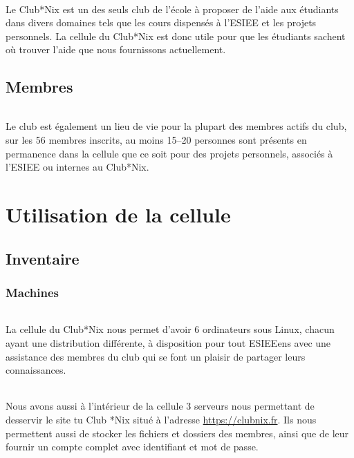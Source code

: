 \documentclass[11pt]{report}
\begin{document}
\paragraph{} Le Club*Nix est un des seuls club de l'école à proposer de l'aide
aux étudiants dans divers domaines tels que les cours dispensés à l'ESIEE et
les projets personnels. La cellule du Club*Nix est donc utile pour que les
étudiants sachent où trouver l'aide que nous fournissons actuellement.


\chapter{Membres}

\paragraph{} Le club est également un lieu de vie pour la plupart des membres
actifs du club, sur les 56 membres inscrits, au moins 15--20 personnes sont
présents en permanence dans la cellule que ce soit pour des projets personnels,
associés à l'ESIEE ou internes au Club*Nix.

\part{Utilisation de la cellule}

\chapter{Inventaire}

\section{Machines}

\paragraph{} La cellule du Club*Nix nous permet d'avoir 6 ordinateurs sous
Linux, chacun ayant une distribution différente, à disposition pour tout
ESIEEens avec une assistance des membres du club qui se font un plaisir de
partager leurs connaissances.

\paragraph{} Nous avons aussi à l'intérieur de la cellule 3 serveurs nous
permettant de desservir le site tu Club *Nix situé à l'adresse
\url{https://clubnix.fr}. Ils nous permettent aussi de stocker les fichiers et
dossiers des membres, ainsi que de leur fournir un compte complet avec
identifiant et mot de passe.
\end{document}
